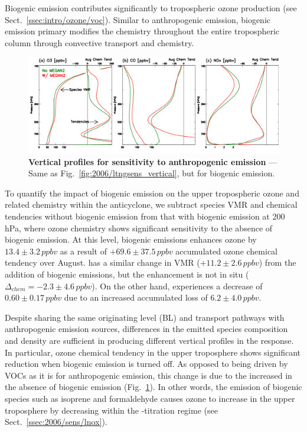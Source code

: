 Biogenic emission contributes significantly to tropospheric ozone production (see Sect.~\ref{ssec:intro/ozone/voc}).
Similar to anthropogenic emission, biogenic emission primary modifies the chemistry throughout the entire tropospheric
column through convective transport and chemistry.

	\begin{figure}[t!]
		\centering
		\includegraphics[width=1.0\textwidth]{sens/biosens_vert}
		\caption[Vertical profiles for sensitivity to anthropogenic emission]{\textbf{Vertical profiles for sensitivity to
		anthropogenic emission} --- Same as Fig.~\ref{fig:2006/ltngsens_vertical}, but for biogenic emission.
		\label{fig:2006/biosens_vert} }\vspace{-.3in}
	\end{figure}

To quantify the impact of biogenic emission on the upper tropospheric ozone and related chemistry within the anticyclone,
we subtract species VMR and chemical tendencies without biogenic emission from that with biogenic emission at
200\,\unit{hPa}, where ozone chemistry shows significant sensitivity to the absence of biogenic emission. At this level,
biogenic emissions enhances ozone by $13.4\pm3.2\,\unit{ppbv}$ as a result of $+69.6\pm37.5\,\unit{ppbv}$ accumulated
ozone chemical tendency over August.  has a similar change in VMR ($+11.2\pm2.6\,\unit{ppbv}$) from the
addition of biogenic emissions, but the enhancement is not in situ ($\Delta_{chem}=-2.3\pm4.6\,\unit{ppbv}$). On the other
hand,  experiences a decrease of $0.60\pm0.17\,\unit{ppbv}$ due to an increased accumulated loss of
$6.2\pm4.0\,\unit{ppbv}$.

Despite sharing the same originating level (BL) and transport pathways with anthropogenic emission sources, differences
in the emitted species composition and density are sufficient in producing different vertical profiles in the response. In
particular, ozone chemical tendency in the upper troposphere shows significant reduction when biogenic emission is
turned off. As opposed to being driven by VOCs as it is for anthropogenic emission, this change is due to the increased
 in the absence of biogenic emission (Fig.~\ref{fig:2006/biosens_vert}). In other words, the emission of
biogenic species such as isoprene and formaldehyde causes ozone to increase in the upper troposphere by decreasing
 within the -titration regime (see Sect.~\ref{ssec:2006/sens/lnox}).


